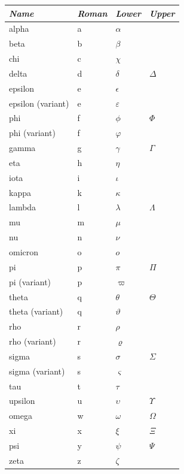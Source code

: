 \setlongtables
\begin{longtable}{l|lll}
  \emph{Name} & \emph{Roman} & \emph{Lower} & \emph{Upper} \\
  \hline
  alpha & a & $\alpha$ & \\
  beta & b & $\beta$ & \\
  chi & c & $\chi$ & \\
  delta & d & $\delta$ & $\Delta$ \\
  epsilon & e & $\epsilon$ & \\
  epsilon (variant) & e & $\varepsilon$ & \\
  phi & f & $\phi$ & $\Phi$ \\
  phi (variant) & f & $\varphi$ & \\
  gamma & g & $\gamma$ & $\Gamma$ \\
  eta & h & $\eta$ & \\
  iota & i & $\iota$ & \\
  kappa & k & $\kappa$ & \\
  lambda & l & $\lambda$ & $\Lambda$ \\
  mu & m & $\mu$ & \\
  nu & n & $\nu$ & \\
  omicron & o & $o$ & \\
  pi & p & $\pi$ & $\Pi$ \\
  pi (variant) & p & $\varpi$ & \\
  theta & q & $\theta$ & $\Theta$ \\
  theta (variant) & q & $\vartheta$ & \\
  rho & r & $\rho$ & \\
  rho (variant) & r & $\varrho$ & \\
  sigma & s & $\sigma$ & $\Sigma$ \\
  sigma (variant) & s & $\varsigma$ & \\
  tau & t & $\tau$ & \\
  upsilon & u & $\upsilon$ & $\Upsilon$ \\
  omega & w & $\omega$ & $\Omega$ \\
  xi & x & $\xi$ & $\Xi$ \\
  psi & y & $\psi$ & $\Psi$ \\
  zeta & z & $\zeta$ & 
\end{longtable}















